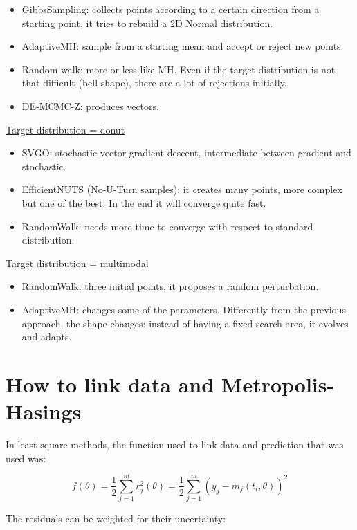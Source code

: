   \begin{itemize}
  \tightlist
  \item
    GibbsSampling: collects points according to a certain direction from a
    starting point, it tries to rebuild a 2D Normal distribution.
  \item
    AdaptiveMH: sample from a starting mean and accept or reject new
    points.
  \item
    Random walk: more or less like MH. Even if the target distribution is
    not that difficult (bell shape), there are a lot of rejections
    initially.
  \item
    DE-MCMC-Z: produces vectors.
  \end{itemize}
  \noindent
  \underline{Target distribution = donut}

  \begin{itemize}
  \tightlist
  \item
    SVGO: stochastic vector gradient descent, intermediate between
    gradient and stochastic.
  \item
    EfficientNUTS (No-U-Turn samples): it creates many points, more
    complex but one of the best. In the end it will converge quite fast.
  \item
    RandomWalk: needs more time to converge with respect to standard
    distribution.
  \end{itemize}
  \noindent
  \underline{Target distribution = multimodal}

  \begin{itemize}
  \tightlist
  \item
    RandomWalk: three initial points, it proposes a random perturbation.
  \item
    AdaptiveMH: changes some of the parameters. Differently from the
    previous approach, the shape changes: instead of having a fixed search
    area, it evolves and adapts.
  \end{itemize}


\section{How to link data and Metropolis-Hasings}
In least square methods, the function used to link data and prediction that was used was:

$$f(\theta)=\frac{1}{2}\sum^m_{j=1}r^2_j(\theta)=\frac{1}{2}\sum^m_{j=1}(y_j-m_j(t_i,\theta))^2$$

The residuals can be weighted for their uncertainty:

